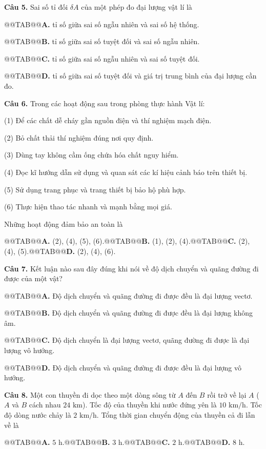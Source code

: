 \documentclass{article}
\begin{document}
\textbf{Câu 5.} Sai số tỉ đối $\delta A$ của một phép đo đại lượng vật lí là

@@TAB@@\textbf{A.} tỉ số giữa sai số ngẫu nhiên và sai số hệ thống.

@@TAB@@\textbf{B.} tỉ số giữa sai số tuyệt đối và sai số ngẫu nhiên.

@@TAB@@\textbf{C.} tỉ số giữa sai số ngẫu nhiên và sai số tuyệt đối.

@@TAB@@\textbf{D.} tỉ số giữa sai số tuyệt đối và giá trị trung bình của đại lượng cần đo.

\textbf{Câu 6.} Trong các hoạt động sau trong phòng thực hành Vật lí: \par (1) Để các chất dễ cháy gần nguồn điện và thí nghiệm mạch điện. \par (2) Bỏ chất thải thí nghiệm đúng nơi quy định. \par (3) Dùng tay không cầm ống chứa hóa chất nguy hiểm. \par (4) Đọc kĩ hướng dẫn sử dụng và quan sát các kí hiệu cảnh báo trên thiết bị. \par (5) Sử dụng trang phục và trang thiết bị bảo hộ phù hợp. \par (6) Thực hiện thao tác nhanh và mạnh bằng mọi giá. \par Những hoạt động đảm bảo an toàn là

@@TAB@@\textbf{A.} (2), (4), (5), (6).@@TAB@@\textbf{B.} (1), (2), (4).@@TAB@@\textbf{C.} (2), (4), (5).@@TAB@@\textbf{D.} (2), (4), (6).

\textbf{Câu 7.} Kết luận nào sau đây đúng khi nói về độ dịch chuyển và quãng đường đi được của một vật?

@@TAB@@\textbf{A.} Độ dịch chuyển và quãng đường đi được đều là đại lượng vectơ.

@@TAB@@\textbf{B.} Độ dịch chuyển và quãng đường đi được đều là đại lượng không âm.

@@TAB@@\textbf{C.} Độ dịch chuyển là đại lượng vectơ, quãng đường đi được là đại lượng vô hướng.

@@TAB@@\textbf{D.} Độ dịch chuyển và quãng đường đi được đều là đại lượng vô hướng.

\textbf{Câu 8.} Một con thuyền đi dọc theo một dòng sông từ $A$ đến $B$ rồi trở về lại $A$ ($A$ và $B$ cách nhau $24\text{ km}$). Tốc độ của thuyền khi nước đứng yên là $10\text{ km/h}$. Tốc độ dòng nước chảy là $2\text{ km/h}$. Tổng thời gian chuyển động của thuyền cả đi lẫn về là

@@TAB@@\textbf{A.} $5\text{ h}$.@@TAB@@\textbf{B.} $3\text{ h}$.@@TAB@@\textbf{C.} $2\text{ h}$.@@TAB@@\textbf{D.} $8\text{ h}$.
\end{document}
